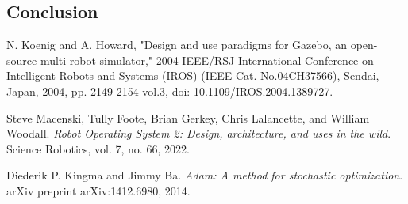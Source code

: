 \documentclass[a4paper]{article}
\begin{document}
\begin{multicols}{2}
\section{Conclusion}  %

\begin{thebibliography}{99}

N. Koenig and A. Howard, "Design and use paradigms for Gazebo, an open-source 
multi-robot simulator," 2004 IEEE/RSJ International Conference on Intelligent Robots 
and Systems (IROS) (IEEE Cat. No.04CH37566), Sendai, Japan, 2004, pp. 2149-2154 vol.3, 
doi: 10.1109/IROS.2004.1389727.
  
Steve Macenski, Tully Foote, Brian Gerkey, Chris Lalancette, and William Woodall. 
\textit{Robot Operating System 2: Design, architecture, and uses in the wild}. 
Science Robotics, vol. 7, no. 66, 2022. 

Diederik P. Kingma and Jimmy Ba. 
\textit{Adam: A method for stochastic optimization}. 
arXiv preprint arXiv:1412.6980, 2014.

\end{thebibliography}

\end{multicols}
\end{document}
